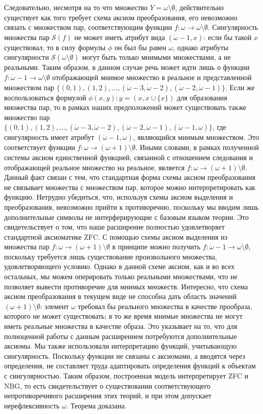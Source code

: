 \documentclass[12pt]{article}
\begin{document}
Следовательно, несмотря на то что множество $Y = \omega \setminus \emptyset$, действительно существует как того требует схема аксиом преобразования, его невозможно связать с множеством пар, соответствующим функции $f : \omega \to \omega \setminus \emptyset$. Сингулярность множества пар $\mathcal{S}(f)$ не может иметь атрибут вида $(\dot{\omega} - 1, x)$: если бы такой $x$ существовал, то в силу формулы $\phi$ он был бы равен $\omega$, однако атрибуты сингулярности $\mathcal{S}(\omega \setminus \emptyset)$ могут быть только мнимыми множествами, а не реальными. Таким образом, в данном случае речь может идти лишь о функции $f: \dot{\omega} - 1 \to \omega \setminus \emptyset$ отображающей мнимое множество в реальное и представленной множеством пар $\{ (0, 1), (1, 2), \dots, (\dot{\omega} - 3, \dot{\omega} - 2), (\dot{\omega} - 2, \dot{\omega} - 1) \}$. Если же воспользоваться формулой $\phi(x, y) : y = (x, x \cup \{ x \})$ для образования множества пар, то в рамках наших предположений может существовать также множество пар $\{ (0, 1), (1, 2), \dots, (\dot{\omega} - 3, \dot{\omega} - 2), (\dot{\omega} - 2, \dot{\omega} - 1), (\dot{\omega} - 1, \omega) \}$, где сингулярность имеет атрибут $(\dot{\omega} - 1, \omega)$, являющийся мнимым множеством. Это соответствует функции $f : \omega \to (\omega + 1) \setminus \emptyset$. Иными словами, в рамках полученной системы аксиом единственной функцией, связанной с отношением следования и отображающей реальное множество на реальное, является $f : \omega \to (\omega + 1) \setminus \emptyset$. Данный факт связан с тем, что стандартная форма схемы аксиом преобразования не связывает множества с множеством пар, которое можно интерпретировать как функцию. Нетрудно убедиться, что, используя схемы аксиом выделения и преобразования, невозможно прийти к противоречию, поскольку мы вводим лишь дополнительные символы не интерферирующие с базовым языком теории. Это свидетельствует о том, что наше расширение полностью удовлетворяет стандартной аксиоматике $\mathrm{ZFC}$. С помощью схемы аксиом выделения из множества пар $f : \omega \to (\omega + 1) \setminus \emptyset$ в принципе можно получить $f : \dot{\omega} - 1 \to \omega \setminus \emptyset$, поскольку требуется лишь существование произвольного множества, удовлетворяющего условию. Однако в данной схеме аксиом, как и во всех остальных, мы можем оперировать только реальными множествами, что не позволяет вывести противоречие для мнимых множеств. Интересно, что схема аксиом преобразования в текущем виде не способна дать область значений $(\omega + 1) \setminus \emptyset$: элемент $\omega$ требовал бы реального множества в качестве прообраза, которого не может существовать; в то же время мнимые множества не могут иметь реальные множества в качестве образа. Это указывает на то, что для полноценной работы с данным расширением потребуются дополнительные аксиомы. Мы также использовали интерпретацию функций, учитывающую сингулярность. Поскольку функции не связаны с аксиомами, а вводятся через определения, не составляет труда адаптировать определения функций к объектам с сингулярностью. Таким образом, построенная модель интерпретирует ZFC и NBG, то есть свидетельствует о существовании соответствующего непротиворечивого расширения этих теорий, и при этом допускает нерефлексивность $\omega$. Теорема доказана. 
\end{document}

